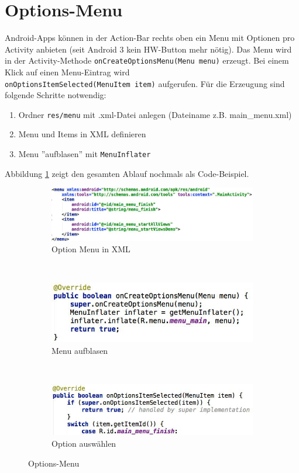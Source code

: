 \section{Options-Menu}

Android-Apps können in der Action-Bar rechts oben ein Menu mit Optionen pro Activity anbieten (seit Android 3 kein HW-Button mehr nötig). Das Menu wird in der Activity-Methode \texttt{onCreateOptionsMenu(Menu menu)} erzeugt. Bei einem Klick auf einen Menu-Eintrag wird \\ \texttt{onOptionsItemSelected(MenuItem item)} aufgerufen. Für die Erzeugung sind folgende Schritte notwendig:
\begin{enumerate}
	\item Ordner \texttt{res/menu} mit .xml-Datei anlegen (Dateiname z.B. main\_menu.xml)
	\item Menu und Items in XML definieren
	\item Menu ''aufblasen'' mit \texttt{MenuInflater}
\end{enumerate}
Abbildung \ref{fig:option-menu} zeigt den gesamten Ablauf nochmals als Code-Beispiel.
\begin{figure}
	\centering
	\begin{subfigure}[b]{0.48\textwidth}
		\includegraphics[width=\textwidth]{fig/option-menu-xml}
		\caption{Option Menu in XML}
	\end{subfigure}
	~
	\begin{subfigure}[b]{0.48\textwidth}
		\includegraphics[width=\textwidth]{fig/option-menu-create}
		\caption{Menu aufblasen}
	\end{subfigure}
	~
	\begin{subfigure}[b]{0.48\textwidth}
		\includegraphics[width=\textwidth]{fig/option-menu-event}
		\caption{Option auswählen}
	\end{subfigure}
	\caption{Options-Menu}
	\label{fig:option-menu}
\end{figure}

